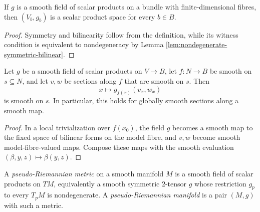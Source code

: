 \begin{lemma}
\label{lem:pseudo-metric-fibre-scalar-product}
\leanok
{}
If $g$ is a smooth field of scalar products on a bundle with finite-dimensional
fibres, then $(V_b,g_b)$ is a scalar product space for every $b\in B$.
\end{lemma}

\begin{proof}
\leanok
{}
\sketch Symmetry and bilinearity follow from the definition, while its witness
condition is equivalent to nondegeneracy by Lemma
\ref{lem:nondegenerate-symmetric-bilinear}.
\end{proof}

\begin{lemma}
\label{lem:pseudo-metric-pairing-smooth}
\leanok
{}
Let $g$ be a smooth field of scalar products on $V\to B$, let $f\colon N\to B$
be smooth on $s\subseteq N$, and let $v,w$ be sections along $f$ that are smooth
on $s$. Then
\[
x\longmapsto g_{f(x)}(v_x,w_x)
\]
is smooth on $s$. In particular, this holds for globally smooth sections along a
smooth map.
\end{lemma}

\begin{proof}
\leanok
{}
\sketch In a local trivialization over $f(x_0)$, the field $g$ becomes a smooth map
to the fixed space of bilinear forms on the model fibre, and $v,w$ become smooth
model-fibre-valued maps. Compose these maps with the smooth evaluation
$(\beta,y,z)\mapsto\beta(y,z)$.
\end{proof}

\begin{definition}
\label{def:pseudo-riemannian-metric}
\leanok
{}
A \emph{pseudo-Riemannian metric} on a smooth manifold $M$ is a smooth field of
scalar products on $TM$, equivalently a smooth symmetric $2$-tensor $g$ whose
restriction $g_p$ to every $T_pM$ is nondegenerate. A \emph{pseudo-Riemannian
manifold} is a pair $(M,g)$ with such a metric.
\end{definition}

